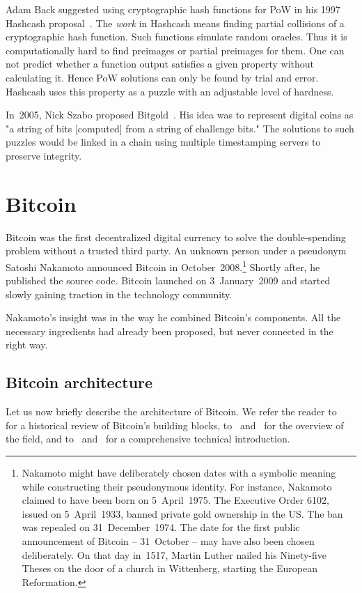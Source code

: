 Adam Back suggested using cryptographic hash functions for PoW in his 1997 Hashcash proposal~\cite{Back1997}.
The \textit{work} in Hashcash means finding partial collisions of a cryptographic hash function.
Such functions simulate random oracles.
Thus it is computationally hard to find preimages or partial preimages for them.
One can not predict whether a function output satisfies a given property without calculating it.
Hence PoW solutions can only be found by trial and error.
Hashcash uses this property as a puzzle with an adjustable level of hardness.

In~2005, Nick Szabo proposed Bitgold~\cite{Szabo2005}.
His idea was to represent digital coins as "a string of bits [computed] from a string of challenge bits."
The solutions to such puzzles would be linked in a chain using multiple timestamping servers to preserve integrity.


\section{Bitcoin}
\label{sec:Bitcoin}

Bitcoin was the first decentralized digital currency to solve the double-spending problem without a trusted third party.
An unknown person under a pseudonym Satoshi Nakamoto announced Bitcoin in October~2008.\footnote{Nakamoto might have deliberately chosen dates with a symbolic meaning while constructing their pseudonymous identity. For instance, Nakamoto claimed to have been born on 5~April~1975. The Executive Order 6102, issued on 5~April~1933, banned private gold ownership in the US. The ban was repealed on 31~December~1974. The date for the first public announcement of Bitcoin -- 31~October -- may have also been chosen deliberately. On that day in~1517, Martin Luther nailed his Ninety-five Theses on the door of a church in Wittenberg, starting the European Reformation.}
Shortly after, he published the source code.
Bitcoin launched on 3~January~2009 and started slowly gaining traction in the technology community.

Nakamoto's insight was in the way he combined Bitcoin's components.
All the necessary ingredients had already been proposed, but never connected in the right way.


\subsection{Bitcoin architecture}

Let us now briefly describe the architecture of Bitcoin.
We refer the reader to~\cite{Narayanan2017} for a historical review of Bitcoin's building blocks, to~\cite{Bonneau2015} and~\cite{Tschorsch2016} for the overview of the field, and to~\cite{Narayanan2016} and~\cite{Antonopoulos2014} for a comprehensive technical introduction.

